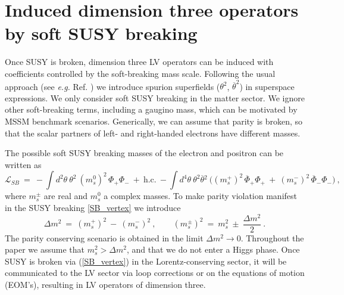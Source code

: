 \documentclass[12pt]{revtex4}
\begin{document}
\section{Induced dimension three operators by soft SUSY breaking}
\label{InducedDim3}


Once SUSY is broken, dimension three LV operators can be induced 
with coefficients controlled by the soft-breaking mass scale. 
Following the usual approach (see {\em e.g.} Ref. \cite{Wess:1992cp})
we introduce spurion superfields ($\theta^2$, $\overline\theta^2$) in
superspace expressions. We only consider soft SUSY breaking in the
matter sector. We ignore other soft-breaking terms, including a
gaugino mass, which can be motivated by MSSM benchmark scenarios.
Generically, we can assume that parity is broken, so that
the scalar partners of left- and right-handed electrons have different masses.


The possible soft SUSY breaking masses of the electron and positron
can be written as 
\begin{equation}
\label{SB_vertex}
  \mathcal{L}_{SB} ~=~  
- \int d^2\theta ~ \theta^2~ 
(m_{s}^0)^2 \, \Phi_+ \Phi_-
~+~ \text{h.c.} 
~- \int d^4\theta ~
\theta^2\overline{\theta}{}^2~ 
\Big( 
(m_s^+)^2\, \overline{\Phi}_+ \Phi_+ 
~+~
(m_s^-)^2\, \overline{\Phi}_- \Phi_-
\Big)  
~, 
\end{equation}
%
where $m_s^\pm$ are real and $m_s^{0}$ a complex masses. 
To make parity violation manifest in the SUSY breaking 
\eqref{SB_vertex} we introduce 
\begin{equation}
\Delta m^2 ~=~ (m_{s}^+)^2 ~ - ~ (m_{s}^-)^2~, 
\qquad
(m_{s}^\pm)^2 ~=~ m_s^2 ~\pm~ \frac{\Delta m^2}2~.
\label{deltam}
\end{equation}
%
The parity conserving scenario is obtained in the limit 
$ \Delta m^2 \to 0 $. Throughout the paper we assume that 
$m_s^2>\Delta m^2$, and that we do not enter a Higgs phase. Once SUSY
is broken via (\ref{SB_vertex}) in the Lorentz-conserving sector, it
will be communicated to the LV sector via loop corrections or on the
equations of motion (EOM's), resulting in LV operators of dimension three.  
\end{document}
